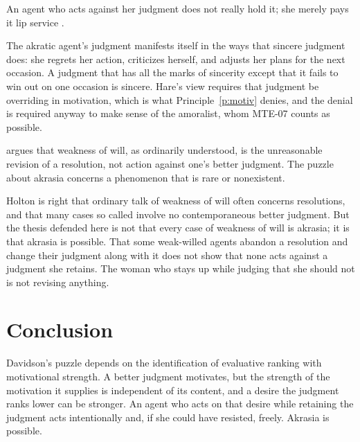 \documentclass{situationist-preprint}
\begin{document}
\begin{objection}[Insincerity]
An agent who acts against her judgment does not really hold it; she merely pays it lip service \citep{Hare1952}.
\end{objection}

\begin{reply}
The akratic agent's judgment manifests itself in the ways that sincere judgment does: she regrets her action, criticizes herself, and adjusts her plans for the next occasion. A judgment that has all the marks of sincerity except that it fails to win out on one occasion is sincere. Hare's view requires that judgment be overriding in motivation, which is what Principle~\ref{p:motiv} denies, and the denial is required anyway to make sense of the amoralist, whom MTE-07 counts as possible.
\end{reply}

\begin{objection}
\citet{Holton1999} argues that weakness of will, as ordinarily understood, is the unreasonable revision of a resolution, not action against one's better judgment. The puzzle about akrasia concerns a phenomenon that is rare or nonexistent.
\end{objection}

\begin{reply}
Holton is right that ordinary talk of weakness of will often concerns resolutions, and that many cases so called involve no contemporaneous better judgment. But the thesis defended here is not that every case of weakness of will is akrasia; it is that akrasia is possible. That some weak-willed agents abandon a resolution and change their judgment along with it does not show that none acts against a judgment she retains. The woman who stays up while judging that she should not is not revising anything.
\end{reply}

\section{Conclusion}

Davidson's puzzle depends on the identification of evaluative ranking with motivational strength. A better judgment motivates, but the strength of the motivation it supplies is independent of its content, and a desire the judgment ranks lower can be stronger. An agent who acts on that desire while retaining the judgment acts intentionally and, if she could have resisted, freely. Akrasia is possible.
\end{document}
